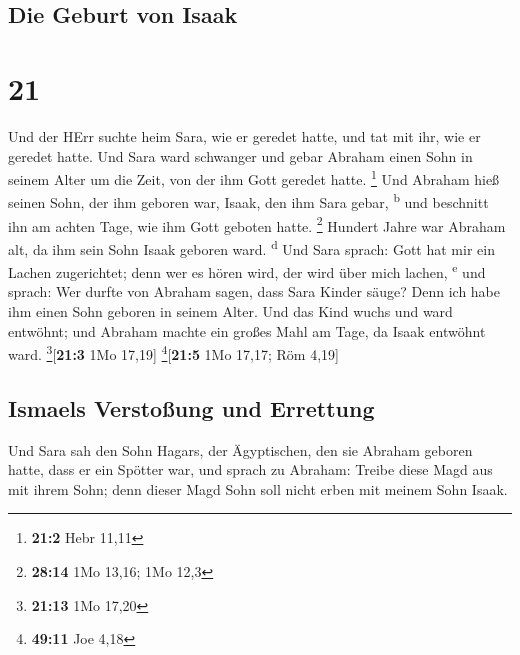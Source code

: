 \hypertarget{die-geburt-von-isaak}{%
\subsection{Die Geburt von Isaak}\label{die-geburt-von-isaak}}

\hypertarget{section-20}{%
\section{21}\label{section-20}}

 Und der HErr suchte heim Sara, wie er geredet hatte, und
tat mit ihr, wie er geredet hatte.  Und Sara ward
schwanger und gebar Abraham einen Sohn in seinem Alter um die Zeit, von
der ihm Gott geredet hatte. \footnote{\textbf{21:2} Hebr 11,11}
 Und Abraham hieß seinen Sohn, der ihm geboren war, Isaak,
den ihm Sara gebar, \textsuperscript{b}  und beschnitt ihn
am achten Tage, wie ihm Gott geboten hatte. \footnote{\textbf{28:14} 1Mo
  13,16; 1Mo 12,3}  Hundert Jahre war Abraham alt, da ihm
sein Sohn Isaak geboren ward. \textsuperscript{d}  Und
Sara sprach: Gott hat mir ein Lachen zugerichtet; denn wer es hören
wird, der wird über mich lachen, \textsuperscript{e}  und
sprach: Wer durfte von Abraham sagen, dass Sara Kinder säuge? Denn ich
habe ihm einen Sohn geboren in seinem Alter.  Und das Kind
wuchs und ward entwöhnt; und Abraham machte ein großes Mahl am Tage, da
Isaak entwöhnt ward. \footnote{\textbf{21:13} 1Mo 17,20}{[}\textbf{21:3}
1Mo 17,19{]} \footnote{\textbf{49:11} Joe 4,18}{[}\textbf{21:5} 1Mo
17,17; Röm 4,19{]}

\hypertarget{ismaels-verstouxdfung-und-errettung}{%
\subsection{Ismaels Verstoßung und
Errettung}\label{ismaels-verstouxdfung-und-errettung}}

 Und Sara sah den Sohn Hagars, der Ägyptischen, den sie
Abraham geboren hatte, dass er ein Spötter war,  und
sprach zu Abraham: Treibe diese Magd aus mit ihrem Sohn; denn dieser
Magd Sohn soll nicht erben mit meinem Sohn Isaak.

